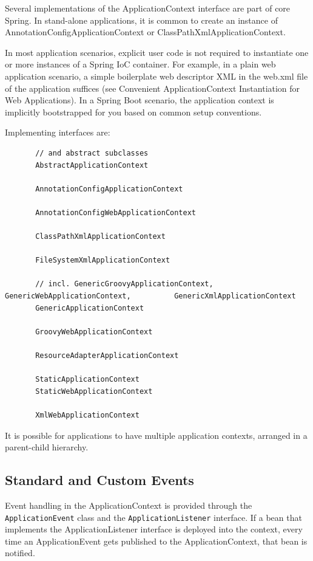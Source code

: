 \documentclass{scrartcl}
\begin{document}
Several implementations of the ApplicationContext interface are part of core Spring. In stand-alone applications, it is common to create an instance of AnnotationConfigApplicationContext or ClassPathXmlApplicationContext.

In most application scenarios, explicit user code is not required to instantiate one or more instances of a Spring IoC container. For example, in a plain web application scenario, a simple boilerplate web descriptor XML in the web.xml file of the application suffices (see Convenient ApplicationContext Instantiation for Web Applications). In a Spring Boot scenario, the application context is implicitly bootstrapped for you based on common setup conventions.

Implementing interfaces are:

\begin{lstlisting}
       // and abstract subclasses
       AbstractApplicationContext

       AnnotationConfigApplicationContext

       AnnotationConfigWebApplicationContext

       ClassPathXmlApplicationContext

       FileSystemXmlApplicationContext

       // incl. GenericGroovyApplicationContext, GenericWebApplicationContext,          GenericXmlApplicationContext
       GenericApplicationContext

       GroovyWebApplicationContext

       ResourceAdapterApplicationContext

       StaticApplicationContext
       StaticWebApplicationContext

       XmlWebApplicationContext
\end{lstlisting}

It is possible for applications to have multiple application contexts, arranged in a parent-child hierarchy.

\subsection{Standard and Custom Events}

Event handling in the ApplicationContext is provided through the \lstinline|ApplicationEvent| class and the \lstinline|ApplicationListener| interface. If a bean that implements the ApplicationListener interface is deployed into the context, every time an ApplicationEvent gets published to the ApplicationContext, that bean is notified.
\end{document}

